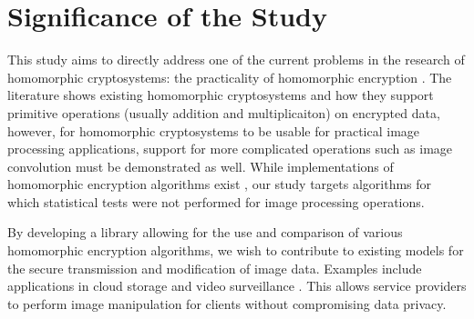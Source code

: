 \section{Significance of the Study}

This study aims to directly address one of the current problems in the research of homomorphic cryptosystems: the practicality of homomorphic encryption \cite{sen_homomorphic_2013}. The literature shows existing homomorphic cryptosystems and how they support primitive operations (usually addition and multiplicaiton) on encrypted data, however, for homomorphic cryptosystems to be usable for practical image processing applications, support for more complicated operations such as image convolution must be demonstrated as well. While implementations of homomorphic encryption algorithms exist \cite{ziad_cryptoimg:_2016, garay_algorithms_2014}, our study targets algorithms for which statistical tests were not performed for image processing operations.

By developing a library allowing for the use and comparison of various homomorphic encryption algorithms, we wish to contribute to existing models for the secure transmission and modification of image data. Examples include applications in cloud storage \cite{potey_homomorphic_2016} and video surveillance \cite{upmanyu_efficient_2009}. This allows service providers to perform image manipulation for clients without compromising data privacy.
